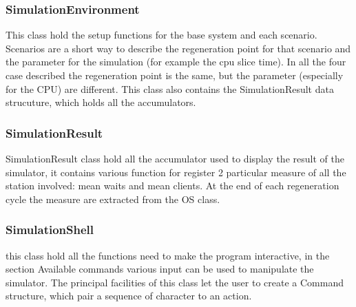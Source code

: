 \documentclass[12pt,a4paper]{article}
\begin{document}
    \subsubsection{SimulationEnvironment}
    This class hold the setup functions for the base system and each scenario. Scenarios are a short way to describe the regeneration point for that scenario and the parameter for the simulation (for example the cpu slice time). In all the four case described the regeneration point is the same, but the parameter (especially for the CPU) are different. This class also contains the SimulationResult data strucuture, which holds all the accumulators.
    \subsubsection{SimulationResult}
    SimulationResult class hold all the accumulator used to display the result of the simulator, it contains various function for register 2 particular measure of all the station involved: mean waits and mean clients. At the end of each regeneration cycle the measure are extracted from the OS class.
    \subsubsection{SimulationShell}
    this class hold all the functions need to make the program interactive, in the section Available commands various input can be used to manipulate the simulator. The principal facilities of this class let the user to create a Command structure, which pair a sequence of character to an action.
\end{document}
